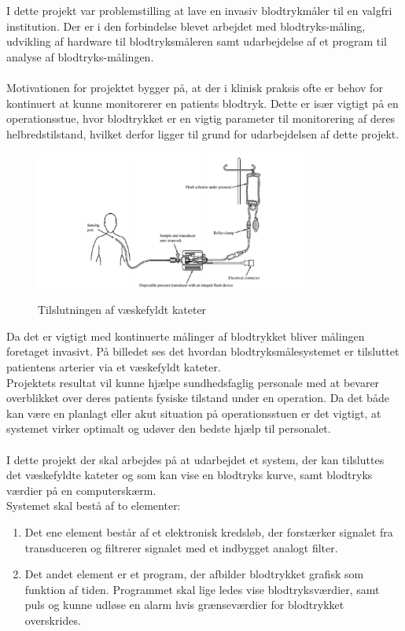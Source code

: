 I dette projekt var problemstilling at lave en invasiv blodtrykmåler til en valgfri institution. Der er i den forbindelse blevet arbejdet med blodtryks-måling, udvikling af hardware til blodtryksmåleren samt udarbejdelse af et program til analyse af blodtryks-målingen.\\ 
\\
Motivationen for projektet bygger på, at der i klinisk praksis ofte er behov for kontinuert at kunne monitorerer en patients blodtryk. Dette er især vigtigt på en operationsstue, hvor blodtrykket er en vigtig parameter til monitorering af deres helbredstilstand, hvilket derfor ligger til grund for udarbejdelsen af dette projekt.\\
\begin{figure}[H]
	\centering
	\includegraphics[width=0.8\textwidth]{Figurer/Indledning/Opstilling}
	\label{Opstilling}
	\caption{Tilslutningen af væskefyldt kateter}
\end{figure}
Da det er vigtigt med kontinuerte målinger af blodtrykket bliver målingen foretaget invasivt. På billedet ses det hvordan blodtryksmålesystemet er tilsluttet patientens arterier via et væskefyldt kateter.\\
Projektets resultat vil kunne hjælpe sundhedsfaglig personale med at bevarer overblikket over deres patients fysiske tilstand under en operation. Da det både kan være en planlagt eller akut situation på operationsstuen er det vigtigt, at systemet virker optimalt og udøver den bedste hjælp til personalet.\\
\\  
I dette projekt der skal arbejdes på at udarbejdet et system, der kan tilsluttes det væskefyldte kateter og som kan vise en blodtryks kurve, samt blodtryks værdier på en computerskærm. \\
Systemet skal bestå af to elementer:
\begin{enumerate}
	\item Det ene element består af et elektronisk kredsløb, der forstærker signalet fra transduceren og filtrerer signalet med et indbygget analogt filter.
	\item Det andet element er et program, der afbilder blodtrykket grafisk som funktion af tiden. Programmet skal lige ledes vise blodtryksværdier, samt puls og kunne udløse en alarm hvis grænseværdier for blodtrykket overskrides. 
\end{enumerate}
